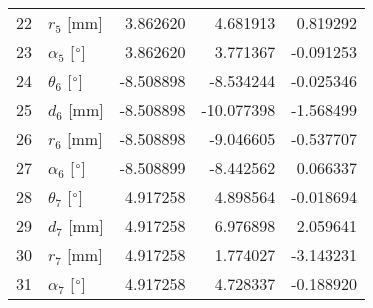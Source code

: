 \documentclass{standalone}%
\begin{document}
\begin{tabular}{llrrr}
22 &              $r_{5}$ [mm] &  3.862620 &   4.681913 &   0.819292 \\
23 &  $\alpha_{5}$ [$\degree$] &  3.862620 &   3.771367 &  -0.091253 \\
24 &  $\theta_{6}$ [$\degree$] & -8.508898 &  -8.534244 &  -0.025346 \\
25 &              $d_{6}$ [mm] & -8.508898 & -10.077398 &  -1.568499 \\
26 &              $r_{6}$ [mm] & -8.508898 &  -9.046605 &  -0.537707 \\
27 &  $\alpha_{6}$ [$\degree$] & -8.508899 &  -8.442562 &   0.066337 \\
28 &  $\theta_{7}$ [$\degree$] &  4.917258 &   4.898564 &  -0.018694 \\
29 &              $d_{7}$ [mm] &  4.917258 &   6.976898 &   2.059641 \\
30 &              $r_{7}$ [mm] &  4.917258 &   1.774027 &  -3.143231 \\
31 &  $\alpha_{7}$ [$\degree$] &  4.917258 &   4.728337 &  -0.188920 \\
\bottomrule
\end{tabular}
%
\end{document}
